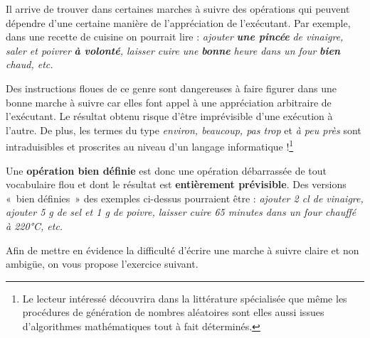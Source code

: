 		Il arrive de trouver dans certaines marches à suivre des opérations qui
		peuvent dépendre d’une certaine manière de l’appréciation de
		l’exécutant. Par exemple, dans une recette de cuisine on pourrait lire
		: \textit{ajouter }\textbf{\textit{une pincée }}\textit{de vinaigre,
		saler et poivrer }\textbf{\textit{à volonté}}\textit{, laisser cuire
		une }\textbf{\textit{bonne}}\textit{ heure dans un four
		}\textbf{\textit{bien}}\textit{ chaud, etc.}
		
		Des instructions floues de ce genre sont dangereuses à faire figurer
		dans une bonne marche à suivre car elles font appel à une appréciation
		arbitraire de l'exécutant. Le résultat obtenu risque
		d’être imprévisible d’une exécution à l’autre. De plus, les termes du
		type \textit{environ, beaucoup, pas trop} et \textit{à peu près }sont
		intraduisibles et proscrites au niveau d’un langage informatique
		!\footnote{Le lecteur intéressé découvrira dans la littérature
		spécialisée que même les procédures de génération de nombres aléatoires
		sont elles aussi issues d’algorithmes mathématiques tout à fait
		déterminés.}
		
		Une \textbf{opération bien définie} est donc une opération débarrassée
		de tout vocabulaire flou et dont le résultat est \textbf{entièrement
		prévisible}. Des versions «~bien définies~» des exemples ci-dessus
		pourraient être : \textit{ajouter 2 cl de vinaigre, ajouter 5 g de sel
		et 1 g de poivre, laisser cuire 65 minutes dans un four chauffé à
		220°C, etc.}

		Afin de mettre en évidence la difficulté d'écrire une
		marche à suivre claire et non ambigüe, on vous propose
		l'exercice suivant.

